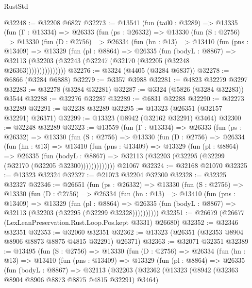 \begin{lexlean}{RustStd}
\begin{coremodule}
@32248 := @32208 @6827
@32273 := @13541
    (fun (tail0 : @3289) =>
    @13335
      (fun (Γ : @13334) =>
      @26333
        (fun (ps : @26332) =>
        @13330
          (fun (S : @2756) =>
          @13330
            (fun (D : @2756) =>
            @26334
              (fun (hn : @13) =>
              @13410
                (fun (pns : @13409) =>
                @13329
                  (fun (pl : @8864) =>
                  @26335
                    (fun (bodyL : @8867) =>
                    @32113 (@32203 (@32243 (@32247 (@32170 (@32205 (@32248 @26363)))))))))))))))
@32276 := @3324 (@4405 (@3284 @6837))
@32278 := @6866 (@3284 @6888)
@32279 := @3357 @3988
@32281 := @4823 @32279 @3297
@32283 := @32278 (@3284 @32281)
@32287 := @3324 (@5826 (@3284 @32283)) @3544
@32288 := @32276 @32287
@32289 := @6831 @32288
@32290 := @32273 @32289
@32291 := @32238 @32289
@32295 := @13323 (@26351 (@32157 @32291) @26371)
@32299 := @13323 (@8942 (@32162 @32291) @3464)
@32300 := @32248 @32289
@32323 := @13559
    (fun (Γ : @13334) =>
    @26333
      (fun (ps : @26332) =>
      @13330
        (fun (S : @2756) =>
        @13330
          (fun (D : @2756) =>
          @26334
            (fun (hn : @13) =>
            @13410
              (fun (pns : @13409) =>
              @13329
                (fun (pl : @8864) =>
                @26335
                  (fun (bodyL : @8867) =>
                  @32113 (@32203 (@32295 (@32299 (@32170 (@32205 @32300)))))))))))))
    @21067
@32324 := @32168 @21070
@32325 := @13323 @32324
@32327 := @21073 @32204 @32300
@32328 := @32325 @32327
@32346 := @26651
    (fun (ps : @26332) =>
    @13330
      (fun (S : @2756) =>
      @13330
        (fun (D : @2756) =>
        @26334
          (fun (hn : @13) =>
          @13410
            (fun (pns : @13409) =>
            @13329
              (fun (pl : @8864) =>
              @26335 (fun (bodyL : @8867) => @32113 (@32203 (@32295 (@32299 @32328))))))))))
@32351 := @26679 (@26677 (LexLeanPreservation.Rust.Loop.Pos.kept @3331) @26680)
@32352 := @32346 @32351
@32353 := @32060 @32351
@32362 := @13323 (@26351 (@32353 @8904 @8906 @8873 @8875 @4815 @32291) @26371)
@32363 := @32071 @32351
@32389 := @13495
    (fun (S : @2756) =>
    @13330
      (fun (D : @2756) =>
      @26334
        (fun (hn : @13) =>
        @13410
          (fun (pns : @13409) =>
          @13329
            (fun (pl : @8864) =>
            @26335
              (fun (bodyL : @8867) =>
              @32113
                (@32203
                  (@32362
                    (@13323
                      (@8942 (@32363 @8904 @8906 @8873 @8875 @4815 @32291) @3464)

\end{coremodule}
\end{lexlean}

